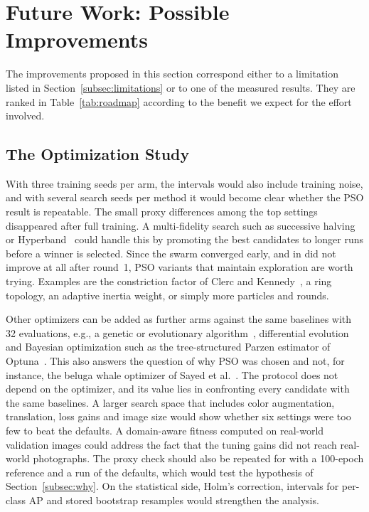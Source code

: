 \section{Future Work: Possible Improvements}
\label{sec:future}

The improvements proposed in this section correspond either to a limitation listed in Section~\ref{subsec:limitations} or to one of the measured results. They are ranked in Table~\ref{tab:roadmap} according to the benefit we expect for the effort involved.

\subsection{The Optimization Study}
\label{subsec:fw-opt}

With three training seeds per arm, the intervals would also include training noise, and with several search seeds per method it would become clear whether the PSO result is repeatable. The small proxy differences among the top settings disappeared after full training. A multi-fidelity search such as successive halving or Hyperband~\cite{li2018hyperband} could handle this by promoting the best candidates to longer runs before a winner is selected. Since the swarm converged early, and in \gentwo did not improve at all after round~1, PSO variants that maintain exploration are worth trying. Examples are the constriction factor of Clerc and Kennedy~\cite{clerc2002particle}, a ring topology, an adaptive inertia weight, or simply more particles and rounds.

Other optimizers can be added as further arms against the same baselines with 32 evaluations, e.g., a genetic or evolutionary algorithm~\cite{young2015optimizing}, differential evolution~\cite{storn1997differential} and Bayesian optimization such as the tree-structured Parzen estimator of Optuna~\cite{akiba2019optuna}. This also answers the question of why PSO was chosen and not, for instance, the beluga whale optimizer of Sayed et al.~\cite{sayed2024intelligent}. The protocol does not depend on the optimizer, and its value lies in confronting every candidate with the same baselines. A larger search space that includes color augmentation, translation, loss gains and image size would show whether six settings were too few to beat the defaults. A domain-aware fitness computed on real-world validation images could address the fact that the tuning gains did not reach real-world photographs. The proxy check should also be repeated for \gentwo with a 100-epoch reference and a run of the defaults, which would test the hypothesis of Section~\ref{subsec:why}. On the statistical side, Holm's correction, intervals for per-class AP and stored bootstrap resamples would strengthen the analysis.

